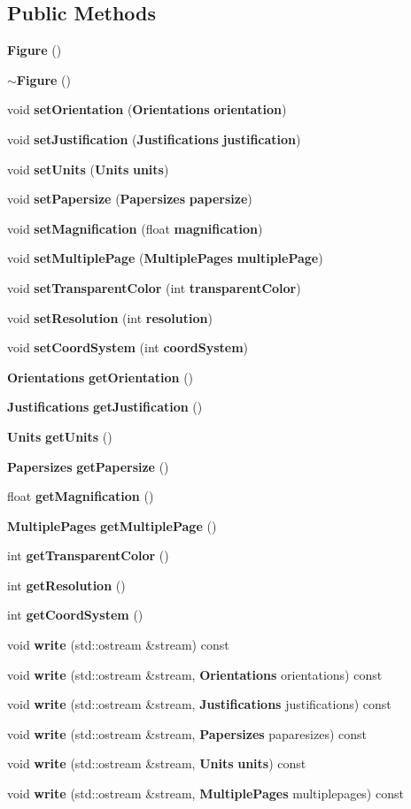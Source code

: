 \subsection*{Public Methods}
\begin{CompactItemize}
\item 
{\bf Figure} ()
\item 
{\bf $\sim$Figure} ()
\item 
void {\bf set\-Orientation} ({\bf Orientations} {\bf orientation})
\item 
void {\bf set\-Justification} ({\bf Justifications} {\bf justification})
\item 
void {\bf set\-Units} ({\bf Units} {\bf units})
\item 
void {\bf set\-Papersize} ({\bf Papersizes} {\bf papersize})
\item 
void {\bf set\-Magnification} (float {\bf magnification})
\item 
void {\bf set\-Multiple\-Page} ({\bf Multiple\-Pages} {\bf multiple\-Page})
\item 
void {\bf set\-Transparent\-Color} (int {\bf transparent\-Color})
\item 
void {\bf set\-Resolution} (int {\bf resolution})
\item 
void {\bf set\-Coord\-System} (int {\bf coord\-System})
\item 
{\bf Orientations} {\bf get\-Orientation} ()
\item 
{\bf Justifications} {\bf get\-Justification} ()
\item 
{\bf Units} {\bf get\-Units} ()
\item 
{\bf Papersizes} {\bf get\-Papersize} ()
\item 
float {\bf get\-Magnification} ()
\item 
{\bf Multiple\-Pages} {\bf get\-Multiple\-Page} ()
\item 
int {\bf get\-Transparent\-Color} ()
\item 
int {\bf get\-Resolution} ()
\item 
int {\bf get\-Coord\-System} ()
\item 
void {\bf write} (std::ostream \&stream) const
\item 
void {\bf write} (std::ostream \&stream, {\bf Orientations} orientations) const
\item 
void {\bf write} (std::ostream \&stream, {\bf Justifications} justifications) const
\item 
void {\bf write} (std::ostream \&stream, {\bf Papersizes} paparesizes) const
\item 
void {\bf write} (std::ostream \&stream, {\bf Units} {\bf units}) const
\item 
void {\bf write} (std::ostream \&stream, {\bf Multiple\-Pages} multiplepages) const
\end{CompactItemize}
